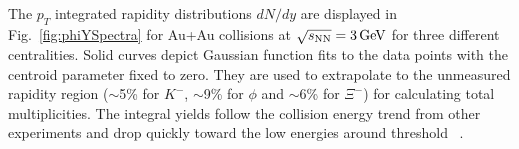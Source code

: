 \documentclass[aps,tightenlines,superscriptaddress,twocolumn]{revtex4-1}
\begin{document}
\begin{table}
\end{table}


The $p_T$ integrated rapidity distributions $dN/dy$ are displayed in Fig.~\ref{fig:phiYSpectra} for Au+Au collisions at ${\sqrt{s_{\rm NN}} = \rm{3\,GeV}}$ for three different centralities. 
Solid curves depict Gaussian function fits to the data points with the centroid parameter fixed to zero. They are used to extrapolate to the unmeasured rapidity region ($\sim$5\% for $K^-$, $\sim$9\% for $\phi$ and $\sim$6\% for $\Xi^-$) for calculating total multiplicities. 
The integral yields follow the collision energy trend from other experiments and drop quickly toward the low energies around threshold  ~\cite{NA49_phi:2008,HADES_phi_ArKCl:2009,FOPI_phi_NiNi:2015,FOPI_phi_AlAl:2016,HADES_phi_AuAu:2018}.

\end{document}
